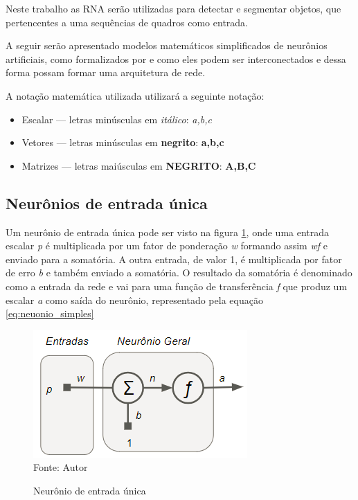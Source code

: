 \documentclass[
	12pt,				%
    oneside,			%
	a4paper,			%
	english,			%
	french,				%
	spanish,			%
	brazil,				%
	]{abntex2}
\begin{document}
Neste trabalho as RNA serão utilizadas para detectar e segmentar objetos, que pertencentes a uma sequências de quadros como entrada. 


A seguir serão apresentado modelos matemáticos simplificados de neurônios artificiais, como formalizados por  e como eles podem ser interconectados e dessa forma possam formar uma arquitetura de rede. 

A notação matemática utilizada utilizará a seguinte notação:

\begin{itemize}
 
\item Escalar  — letras minúsculas em \textit{itálico}: \textit{a,b,c}
\item Vetores  — letras minúsculas em \textbf{negrito}: \textbf{a,b,c}
\item Matrizes — letras maiúsculas em \textbf{NEGRITO}: \textbf{A,B,C} 

\end{itemize}

\subsection {Neurônios de entrada única}

Um neurônio de entrada única pode ser visto na figura \ref{fig:Neurônio_geral1}, onde uma entrada escalar \textit{p} é multiplicada por um fator de ponderação \textit{w} formando assim \textit{wf} e enviado para a somatória. A outra entrada, de valor 1, é multiplicada por fator de erro \textit{b} e também enviado a somatória. O resultado da somatória é denominado como a entrada da rede e vai para uma função de transferência \textit{f} que produz um escalar \textit{a} como saída do neurônio,  representado pela equação \ref{eq:neuonio_simples}

\begin{figure}[H]
    \centering
    \caption{Neurônio de entrada única}
    \includegraphics[scale=1]{Neuronio_geral1}\\
    Fonte: Autor\hfill
    \label{fig:Neurônio_geral1}
\end{figure}
\end{document}
